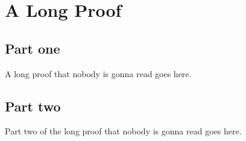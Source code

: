 \section{A Long Proof}
\label{app:long_proof}

\subsection{Part one}
A long proof that nobody is gonna read goes here.

\subsection{Part two}
Part two of the long proof that nobody is gonna read goes here.

\Blindtext[1]

